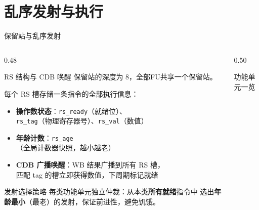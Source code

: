 \documentclass[aspectratio=169,xcolor={dvipsnames,svgnames},10pt]{beamer}
\newcommand{\hl}[1]{\textcolor{AccentOrange}{\textbf{#1}}}
\newcommand{\code}[1]{\texttt{\small\color{PrimaryBlue}#1}}
\begin{document}
\section{乱序发射与执行}

\begin{frame}[shrink=15]{保留站与乱序发射}
  \begin{columns}[T]
    \begin{column}{0.48\textwidth}
      \begin{block}{RS 结构与 CDB 唤醒}
        \small 保留站的深度为 8，全部FU共享一个保留站。

        \small 每个 RS 槽存储一条指令的全部执行信息：
        \begin{itemize}
          \item \textbf{操作数状态}：\code{rs\_ready}（就绪位）、\\
                \code{rs\_tag}（物理寄存器号）、\code{rs\_val}（数值）
          \item \textbf{年龄计数}：\code{rs\_age}\\
                （全局计数器快照，越小越老）
          \item \textbf{CDB 广播唤醒}：WB 结果广播到所有 RS 槽，\\
                匹配 tag 的槽立即获得数值，下周期标记就绪
        \end{itemize}
      \end{block}
      \vspace{0.15cm}
      \begin{alertblock}{发射选择策略}
        \small 每类功能单元独立仲裁：从本类\hl{所有就绪}指令中
        选出\hl{年龄最小}（最老）的发射，保证前进性，避免饥饿。
      \end{alertblock}
    \end{column}
    \begin{column}{0.50\textwidth}
      \begin{block}{功能单元一览}
        \footnotesize\renewcommand{\arraystretch}{1.0}
\end{block}
\end{column}
\end{columns}
\end{frame}
\end{document}
